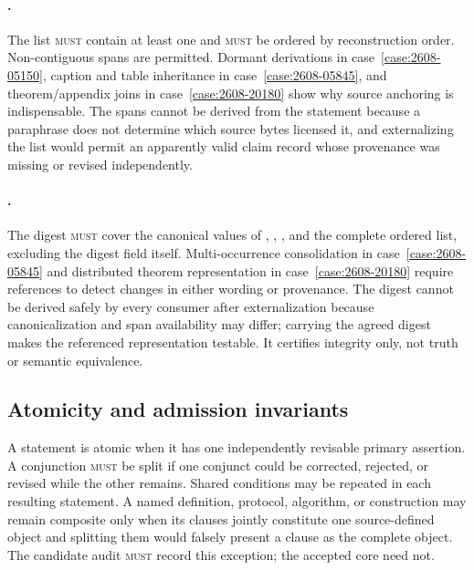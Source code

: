 \paragraph{.}
The list \textsc{must} contain at least one \SourceSpan{} and \textsc{must} be ordered by reconstruction order. Non-contiguous spans are permitted. Dormant derivations in case~\ref{case:2608-05150}, caption and table inheritance in case~\ref{case:2608-05845}, and theorem/appendix joins in case~\ref{case:2608-20180} show why source anchoring is indispensable. The spans cannot be derived from the statement because a paraphrase does not determine which source bytes licensed it, and externalizing the list would permit an apparently valid claim record whose provenance was missing or revised independently.

\paragraph{.}
The digest \textsc{must} cover the canonical values of , , , and the complete ordered  list, excluding the digest field itself. Multi-occurrence consolidation in case~\ref{case:2608-05845} and distributed theorem representation in case~\ref{case:2608-20180} require references to detect changes in either wording or provenance. The digest cannot be derived safely by every consumer after externalization because canonicalization and span availability may differ; carrying the agreed digest makes the referenced representation testable. It certifies integrity only, not truth or semantic equivalence.

\subsection{Atomicity and admission invariants}

A statement is atomic when it has one independently revisable primary assertion. A conjunction \textsc{must} be split if one conjunct could be corrected, rejected, or revised while the other remains. Shared conditions may be repeated in each resulting statement. A named definition, protocol, algorithm, or construction may remain composite only when its clauses jointly constitute one source-defined object and splitting them would falsely present a clause as the complete object. The candidate audit \textsc{must} record this exception; the accepted core need not.

